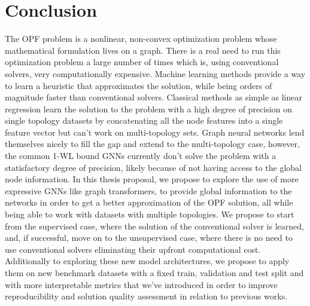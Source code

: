 \section*{Conclusion}

The OPF problem is a nonlinear, non-convex optimization problem whose mathematical
formulation lives on a graph.
There is a real need to run this optimization problem a large number of times which is,
using conventional solvers, very computationally expensive.
Machine learning methods provide a way to learn a heuristic that approximates the solution,
while being orders of magnitude faster than conventional solvers.
Classical methods as simple as linear regression learn the solution to the problem
with a high degree of precision on single topology datasets by concatenating all the
node features into a single feature vector but can't work on multi-topology sets.
Graph neural networks lend themselves nicely to fill the gap and extend to the
multi-topology case, however, the common 1-WL bound GNNs currently don't solve
the problem with a statisfactory degree of precision, likely because of not having
access to the global node information.
In this thesis proposal, we propose to explore the use of more expressive GNNs
like graph transformers, to provide global information to the networks in order
to get a better approximation of the OPF solution, all while being able to work
with datasets with multiple topologies.
We propose to start from the supervised case, where the solution of the conventional
solver is learned, and, if successful, move on to the unsupervised case, where there is
no need to use conventional solvers eliminating their upfront computational cost.
Additionally to exploring these new model architectures, we propose to apply them
on new benchmark datasets with a fixed train, validation and test split and with
more interpretable metrics that we've introduced in order to improve reproducibility
and solution quality assessment in relation to previous works.
